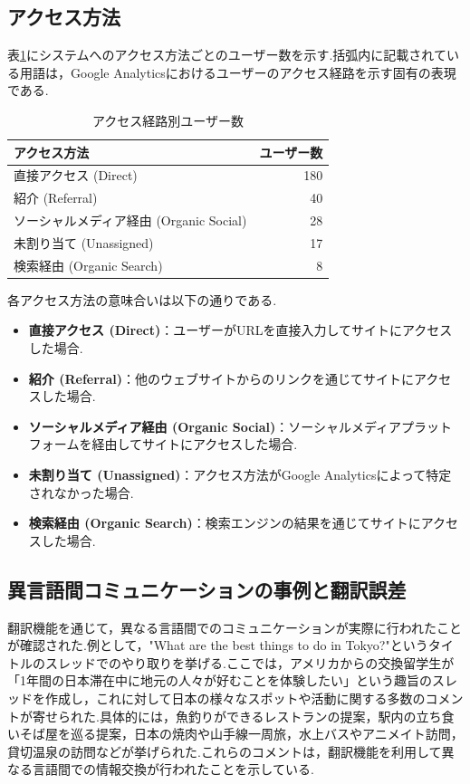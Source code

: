 \documentclass[b5paper,12pt,dvipdfmx]{jsreport}
\begin{document}
\subsection{アクセス方法}
表\ref{table:access-methods}にシステムへのアクセス方法ごとのユーザー数を示す.括弧内に記載されている用語は，Google Analyticsにおけるユーザーのアクセス経路を示す固有の表現である.

\begin{table}[H]
    \centering
    \caption{アクセス経路別ユーザー数}
    \label{table:access-methods}
    \begin{tabular}{|l|r|}
        \hline
        \textbf{アクセス方法} & \textbf{ユーザー数} \\
        \hline
        直接アクセス (Direct) & 180 \\
        紹介 (Referral) & 40 \\
        ソーシャルメディア経由 (Organic Social) & 28 \\
        未割り当て (Unassigned) & 17 \\
        検索経由 (Organic Search) & 8 \\
        \hline
    \end{tabular}
\end{table}

各アクセス方法の意味合いは以下の通りである.
\begin{itemize}
    \item \textbf{直接アクセス (Direct)}：ユーザーがURLを直接入力してサイトにアクセスした場合.
    \item \textbf{紹介 (Referral)}：他のウェブサイトからのリンクを通じてサイトにアクセスした場合.
    \item \textbf{ソーシャルメディア経由 (Organic Social)}：ソーシャルメディアプラットフォームを経由してサイトにアクセスした場合.
    \item \textbf{未割り当て (Unassigned)}：アクセス方法がGoogle Analyticsによって特定されなかった場合.
    \item \textbf{検索経由 (Organic Search)}：検索エンジンの結果を通じてサイトにアクセスした場合.
\end{itemize}


\subsection{異言語間コミュニケーションの事例と翻訳誤差}
翻訳機能を通じて，異なる言語間でのコミュニケーションが実際に行われたことが確認された.例として，"What are the best things to do in Tokyo?"というタイトルのスレッドでのやり取りを挙げる.ここでは，アメリカからの交換留学生が「1年間の日本滞在中に地元の人々が好むことを体験したい」という趣旨のスレッドを作成し，これに対して日本の様々なスポットや活動に関する多数のコメントが寄せられた.具体的には，魚釣りができるレストランの提案，駅内の立ち食いそば屋を巡る提案，日本の焼肉や山手線一周旅，水上バスやアニメイト訪問，貸切温泉の訪問などが挙げられた.これらのコメントは，翻訳機能を利用して異なる言語間での情報交換が行われたことを示している.
\end{document}
